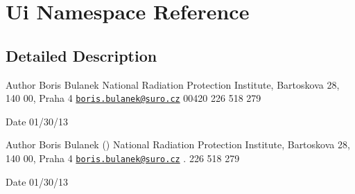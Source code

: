 \hypertarget{namespaceUi}{\section{Ui Namespace Reference}
\label{namespaceUi}
}


\subsection{Detailed Description}
\begin{DoxyAuthor}{Author}
Boris Bulanek  National Radiation Protection Institute, Bartoskova 28, 140 00, Praha 4  \href{mailto:boris.bulanek@suro.cz}{\tt boris.\-bulanek@suro.\-cz}  00420 226 518 279 
\end{DoxyAuthor}
\begin{DoxyDate}{Date}
01/30/13
\end{DoxyDate}
\begin{DoxyAuthor}{Author}
Boris Bulanek ()  National Radiation Protection Institute, Bartoskova 28, 140 00, Praha 4  \href{mailto:boris.bulanek@suro.cz}{\tt boris.\-bulanek@suro.\-cz} . 226 518 279 
\end{DoxyAuthor}
\begin{DoxyDate}{Date}
01/30/13 
\end{DoxyDate}
